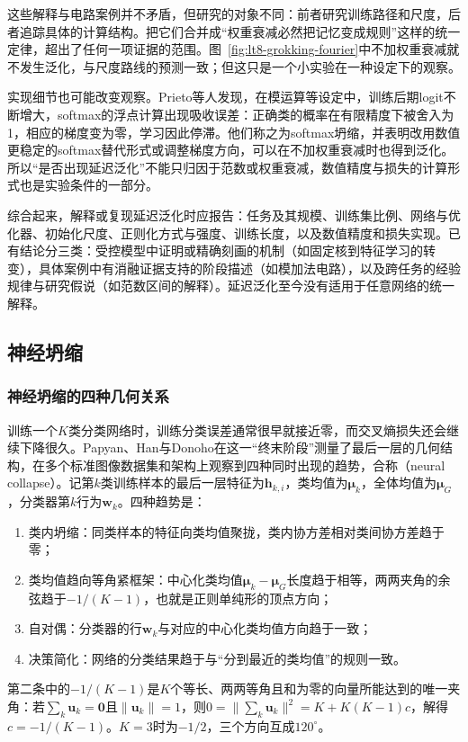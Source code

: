 这些解释与电路案例并不矛盾，但研究的对象不同：前者研究训练路径和尺度，后者追踪具体的计算结构。把它们合并成“权重衰减必然把记忆变成规则”这样的统一定律，超出了任何一项证据的范围。图~\ref{fig:lt8-grokking-fourier}中不加权重衰减就不发生泛化，与尺度路线的预测一致；但这只是一个小实验在一种设定下的观察。

实现细节也可能改变观察。Prieto等人发现，在模运算等设定中，训练后期logit不断增大，softmax的浮点计算出现吸收误差：正确类的概率在有限精度下被舍入为1，相应的梯度变为零，学习因此停滞。他们称之为softmax坍缩，并表明改用数值更稳定的softmax替代形式或调整梯度方向，可以在不加权重衰减时也得到泛化。所以“是否出现延迟泛化”不能只归因于范数或权重衰减，数值精度与损失的计算形式也是实验条件的一部分。

综合起来，解释或复现延迟泛化时应报告：任务及其规模、训练集比例、网络与优化器、初始化尺度、正则化方式与强度、训练长度，以及数值精度和损失实现。已有结论分三类：受控模型中证明或精确刻画的机制（如固定核到特征学习的转变），具体案例中有消融证据支持的阶段描述（如模加法电路），以及跨任务的经验规律与研究假说（如范数区间的解释）。延迟泛化至今没有适用于任意网络的统一解释。

\subsection{神经坍缩}
\label{sec:neural-collapse}

\subsubsection{神经坍缩的四种几何关系}

训练一个$K$类分类网络时，训练分类误差通常很早就接近零，而交叉熵损失还会继续下降很久。Papyan、Han与Donoho在这一“终末阶段”测量了最后一层的几何结构，在多个标准图像数据集和架构上观察到四种同时出现的趋势，合称（neural collapse）。记第$k$类训练样本的最后一层特征为$\bm h_{k,i}$，类均值为$\bm\mu_k$，全体均值为$\bm\mu_G$，分类器第$k$行为$\bm w_k$。四种趋势是：
\begin{enumerate}
 \item 类内坍缩：同类样本的特征向类均值聚拢，类内协方差相对类间协方差趋于零；
 \item 类均值趋向等角紧框架：中心化类均值$\bm\mu_k-\bm\mu_G$长度趋于相等，两两夹角的余弦趋于$-1/(K-1)$，也就是正则单纯形的顶点方向；
 \item 自对偶：分类器的行$\bm w_k$与对应的中心化类均值方向趋于一致；
 \item 决策简化：网络的分类结果趋于与“分到最近的类均值”的规则一致。
\end{enumerate}
第二条中的$-1/(K-1)$是$K$个等长、两两等角且和为零的向量所能达到的唯一夹角：若$\sum_k\bm u_k=\bm 0$且$\|\bm u_k\|=1$，则$0=\|\sum_k\bm u_k\|^2=K+K(K-1)c$，解得$c=-1/(K-1)$。$K=3$时为$-1/2$，三个方向互成$120^\circ$。

